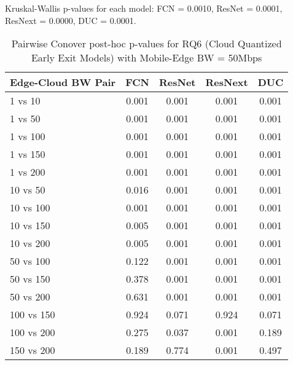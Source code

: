 \begin{table}[h]
\centering
\caption{Pairwise Conover post-hoc p-values for RQ6 (Cloud Quantized Early Exit Models) with Mobile-Edge BW = 50Mbps}
\label{tab:conover_cloud_quantized_earlyexit_me50}
\smallskip
Kruskal-Wallis p-values for each model: FCN = 0.0010, ResNet = 0.0001, ResNext = 0.0000, DUC = 0.0001.

\begin{tabular}{lcccc}
\toprule
Edge-Cloud BW Pair & FCN & ResNet & ResNext & DUC \\
\midrule
1 vs 10 & 0.001 & 0.001 & 0.001 & 0.001 \\
1 vs 50 & 0.001 & 0.001 & 0.001 & 0.001 \\
1 vs 100 & 0.001 & 0.001 & 0.001 & 0.001 \\
1 vs 150 & 0.001 & 0.001 & 0.001 & 0.001 \\
1 vs 200 & 0.001 & 0.001 & 0.001 & 0.001 \\
10 vs 50 & 0.016 & 0.001 & 0.001 & 0.001 \\
10 vs 100 & 0.001 & 0.001 & 0.001 & 0.001 \\
10 vs 150 & 0.005 & 0.001 & 0.001 & 0.001 \\
10 vs 200 & 0.005 & 0.001 & 0.001 & 0.001 \\
50 vs 100 & 0.122 & 0.001 & 0.001 & 0.001 \\
50 vs 150 & 0.378 & 0.001 & 0.001 & 0.001 \\
50 vs 200 & 0.631 & 0.001 & 0.001 & 0.001 \\
100 vs 150 & 0.924 & 0.071 & 0.924 & 0.071 \\
100 vs 200 & 0.275 & 0.037 & 0.001 & 0.189 \\
150 vs 200 & 0.189 & 0.774 & 0.001 & 0.497 \\
\bottomrule
\end{tabular}
\end{table}

